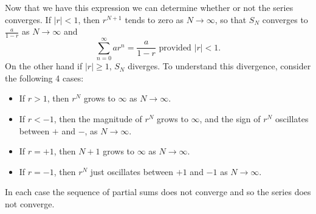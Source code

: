 \begin{eg}
Now that we have this expression we can determine whether or not the
series converges. If $|r|<1$, then $r^{N+1}$
tends to zero as $N\rightarrow\infty$, so that $S_N$  converges to $\frac{a}{1-r}$ as $N\rightarrow\infty$ and
\begin{equation}
\sum_{n=0}^\infty ar^n = \frac{a}{1-r}
\text{ provided $|r|<1$}. \label{eq:geomsum}
\end{equation}
On the other hand if $|r|\ge 1$, $S_N$ diverges.
To understand this divergence, consider the following 4 cases:
\begin{itemize}
\item If $r>1$, then $r^N$ grows to $\infty$ as $N\rightarrow\infty$.
\item If $r<-1$, then the magnitude of $r^N$ grows to $\infty$, and the sign of $r^N$ oscillates between $+$ and $-$,
as $N\rightarrow\infty$.
\item If $r=+1$, then $N+1$ grows to $\infty$ as $N\rightarrow\infty$.
\item If $r=-1$, then $r^N$ just oscillates between $+1$ and $-1$ as $N\rightarrow\infty$.
\end{itemize}
In each case the sequence of partial sums does not converge and so the series does not converge.
\end{eg}
\goodbreak

